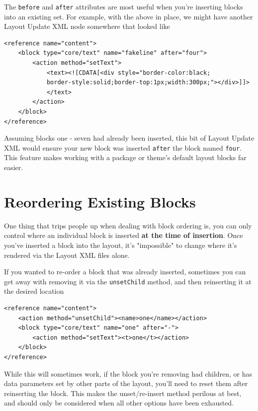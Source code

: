 \documentclass[oneside]{book}
\begin{document}
The \footnotesize\texttt{before} \normalsize  and \footnotesize\texttt{after} \normalsize  attributes are most useful when you're inserting blocks into an existing set.  For example, with the above in place, we might have another Layout Update XML node somewhere that looked like

\begin{lstlisting}
<reference name="content">
    <block type="core/text" name="fakeline" after="four">
        <action method="setText">
            <text><![CDATA[<div style="border-color:black;
            border-style:solid;border-top:1px;width:300px;"></div>]]>
            </text>
        </action>
    </block>
</reference>

\end{lstlisting}


Assuming blocks one - seven had already been inserted, this bit of Layout Update XML would ensure your new block was inserted \footnotesize\texttt{after} \normalsize  the block named \footnotesize\texttt{four}\normalsize.  This feature makes working with a package or theme's default layout blocks far easier.

\section{Reordering Existing Blocks}

One thing that trips people up when dealing with block ordering is, you can only control where an individual block is inserted \textbf{at the time of insertion}.  Once you've inserted a block into the layout, it's "impossible" to change where it's rendered via the Layout XML files alone.

If you wanted to re-order a block that was already inserted, sometimes you can get away with removing it via the \footnotesize\texttt{unsetChild} \normalsize  method, and then reinserting it at the desired location

\begin{lstlisting}
<reference name="content">
    <action method="unsetChild"><name>one</name></action>       
    <block type="core/text" name="one" after="-">
        <action method="setText"><t>one</t></action>
    </block>
</reference>

\end{lstlisting}


While this will sometimes work, if the block you're removing had children, or has data parameters set by other parts of the layout, you'll need to reset them after reinserting the block.  This makes the unset/re-insert method perilous at best, and should only be considered when all other options have been exhausted.
\end{document}
